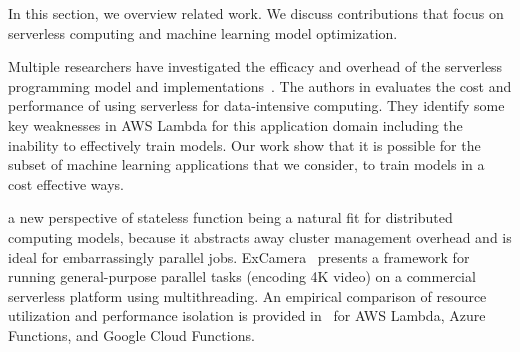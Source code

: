 In this section, we overview related work. We discuss contributions that focus
on serverless computing and machine learning model optimization. 

Multiple researchers have investigated the efficacy and overhead of the
serverless programming model and 
implementations~\cite{ref:baldini2017,ref:jonas2017occupy,ref:onesteptwostep,ref:lin2018tracking}.
The authors in \cite{ref:onesteptwostep} evaluates the cost and performance of using
serverless for data-intensive computing.  They identify some key weaknesses in AWS
Lambda for this application domain including the inability to effectively train models.
Our work show that it is possible for the subset of machine learning applications that we 
consider, to train models in a cost effective ways.

a new perspective of stateless function being a natural fit for distributed computing models, because it 
abstracts away cluster management overhead and is ideal for embarrassingly parallel jobs. 
ExCamera~\cite{ref:encoding} presents a 
framework for running general-purpose parallel tasks (encoding 4K video) 
on a commercial serverless platform using multithreading. 
An empirical comparison of resource utilization and performance isolation
is provided in~\cite{ref:peeking} for AWS Lambda, 
Azure Functions, and Google Cloud Functions.


